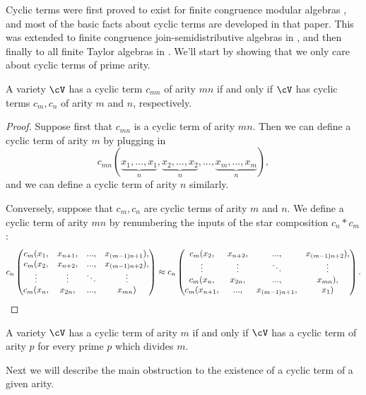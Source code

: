 Cyclic terms were first proved to exist for finite congruence modular algebras \cite{congruence-modular-cyclic}, and most of the basic facts about cyclic terms are developed in that paper. This was extended to finite congruence join-semidistributive algebras in \cite{sd-join-cyclic}, and then finally to all finite Taylor algebras in \cite{cyclic}. We'll start by showing that we only care about cyclic terms of prime arity.

\begin{prop} A variety $\cV$ has a cyclic term $c_{mn}$ of arity $mn$ if and only if $\cV$ has cyclic terms $c_m, c_n$ of arity $m$ and $n$, respectively.
\end{prop}
\begin{proof} Suppose first that $c_{mn}$ is a cyclic term of arity $mn$. Then we can define a cyclic term of arity $m$ by plugging in
\[
c_{mn}(\underbrace{x_1, ..., x_1}_{n}, \underbrace{x_2, ..., x_2}_{n}, ..., \underbrace{x_m, ..., x_m}_{n}),
\]
and we can define a cyclic term of arity $n$ similarly.

Conversely, suppose that $c_m, c_n$ are cyclic terms of arity $m$ and $n$. We define a cyclic term of arity $mn$ by renumbering the inputs of the star composition $c_n*c_m$:
\[
c_n\begin{pmatrix}c_m(x_1, & x_{n+1}, & ..., & x_{(m-1)n+1}),\\
c_m(x_2, & x_{n+2}, & ..., & x_{(m-1)n+2}),\\
\vdots & \vdots & \ddots & \vdots\\
c_m(x_n, & x_{2n}, & ..., & x_{mn})
\end{pmatrix} \approx
c_n\begin{pmatrix} c_m(x_2, & x_{n+2}, & ..., & x_{(m-1)n+2}),\\
\vdots & \vdots & \ddots & \vdots\\
c_m(x_n, & x_{2n}, & ..., & x_{mn}),\\
c_m(x_{n+1}, & ..., & x_{(m-1)n+1}, & x_1)
\end{pmatrix}.\qedhere
\]
\end{proof}

\begin{cor} A variety $\cV$ has a cyclic term of arity $m$ if and only if $\cV$ has a cyclic term of arity $p$ for every prime $p$ which divides $m$.
\end{cor}

Next we will describe the main obstruction to the existence of a cyclic term of a given arity.


